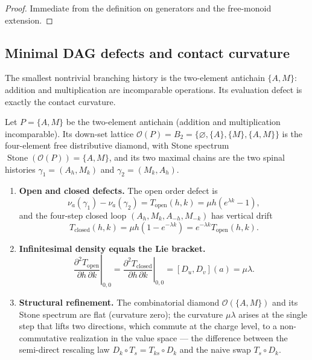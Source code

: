 \begin{proof}
Immediate from the definition on generators and the free-monoid extension.
\end{proof}

\subsection{Minimal DAG defects and contact curvature}

The smallest nontrivial branching history is the two-element antichain
$\{A,M\}$: addition and multiplication are incomparable operations.  Its
evaluation defect is exactly the contact curvature.

\begin{theorem}
\label{thm:dag-defect-equals-curvature}
Let $P=\{A,M\}$ be the two-element antichain (addition and multiplication
incomparable).  Its down-set lattice
$\mathcal O(P)=B_2=\{\varnothing,\{A\},\{M\},\{A,M\}\}$ is the four-element free
distributive diamond, with Stone spectrum
$\operatorname{Stone}(\mathcal O(P))=\{A,M\}$, and its two maximal chains are the
two spinal histories $\gamma_1=(A_h,M_k)$ and $\gamma_2=(M_k,A_h)$.
\begin{enumerate}
  \item \textbf{Open and closed defects.} The open order defect is
  \[
    \nu_a(\gamma_1)-\nu_a(\gamma_2)=T_{\mathrm{open}}(h,k)=\mu h(e^{\lambda k}-1),
  \]
  and the four-step closed loop $(A_h,M_k,A_{-h},M_{-k})$ has vertical drift
  \[
    T_{\mathrm{closed}}(h,k)=\mu h(1-e^{-\lambda k})=e^{-\lambda k}T_{\mathrm{open}}(h,k).
  \]
  \item \textbf{Infinitesimal density equals the Lie bracket.}
  \[
    \left.\frac{\partial^2 T_{\mathrm{open}}}{\partial h\,\partial k}\right|_{0,0}
    =
    \left.\frac{\partial^2 T_{\mathrm{closed}}}{\partial h\,\partial k}\right|_{0,0}
    =[D_u,D_v](a)=\mu\lambda .
  \]
  \item \textbf{Structural refinement.} The combinatorial diamond
  $\mathcal O(\{A,M\})$ and its Stone spectrum are flat (curvature zero); the
  curvature $\mu\lambda$ arises at the single step that lifts two directions,
  which commute at the charge level, to a non-commutative realization in the
  value space --- the difference between the semi-direct rescaling law
  $D_k\circ T_s=T_{ks}\circ D_k$ and the naive swap $T_s\circ D_k$.
\end{enumerate}
\end{theorem}

